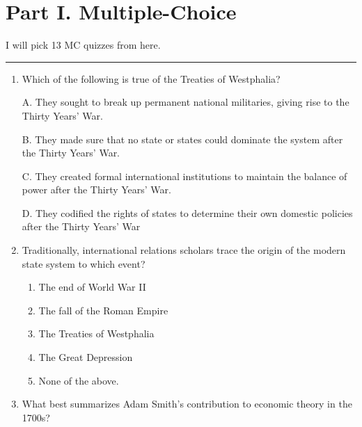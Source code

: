 \documentclass[
]{book}
\begin{document}
\hypertarget{part-i.-multiple-choice}{%
\section*{Part I. Multiple-Choice}\label{part-i.-multiple-choice}}

I will pick 13 MC quizzes from here.

\begin{center}\rule{0.5\linewidth}{0.5pt}\end{center}

\begin{enumerate}
\def\labelenumi{\arabic{enumi}.}
\item
  Which of the following is true of the Treaties of Westphalia?

  A. They sought to break up permanent national militaries, giving rise to the Thirty Years' War.

  B. They made sure that no state or states could dominate the system after the Thirty Years' War.

  C. They created formal international institutions to maintain the balance of power after the Thirty Years' War.

  D. They codified the rights of states to determine their own domestic policies after the Thirty Years' War
\item
  Traditionally, international relations scholars trace the origin of the modern state system to which event?

  \begin{enumerate}
  \def\labelenumii{\Alph{enumii}.}
  \item
    The end of World War II
  \item
    The fall of the Roman Empire
  \item
    The Treaties of Westphalia
  \item
    The Great Depression
  \item
    None of the above.
  \end{enumerate}
\item
  What best summarizes Adam Smith's contribution to economic theory in the 1700s?


\end{enumerate}
\end{document}
